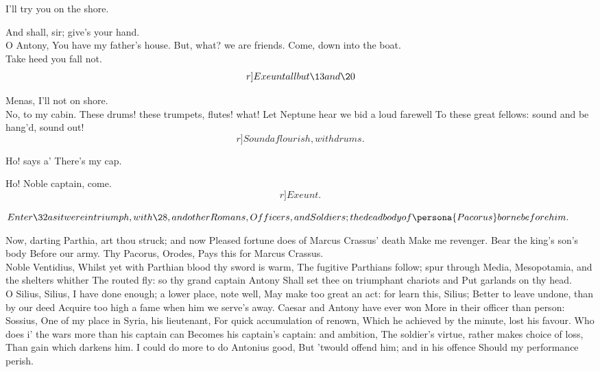 \documentclass{book}
\begin{document}
	I'll try you on the shore.

\1	And shall, sir; give's your hand. \\

	O Antony,
	You have my father's house. But, what? we are friends.
	Come, down into the boat. \\

	Take heed you fall not.
	\[r]Exeunt all but \13 and \20\]

	Menas, I'll not on shore. \\

	No, to my cabin.
	These drums! these trumpets, flutes! what!
	Let Neptune hear we bid a loud farewell
	To these great fellows: sound and be hang'd, sound out!
	\[r]Sound a flourish, with drums.\]

	Ho! says a' There's my cap.

	Ho! Noble captain, come. \[r]Exeunt.\]

\Act





	\(Enter \32 as it were in triumph, with \28,
	and other Romans, Officers, and Soldiers; the dead
	body of \persona{Pacorus} borne before him.\)

	Now, darting Parthia, art thou struck; and now
	Pleased fortune does of Marcus Crassus' death
	Make me revenger. Bear the king's son's body
	Before our army. Thy Pacorus, Orodes,
	Pays this for Marcus Crassus. \\

	Noble Ventidius,
	Whilst yet with Parthian blood thy sword is warm,
	The fugitive Parthians follow; spur through Media,
	Mesopotamia, and the shelters whither
	The routed fly: so thy grand captain Antony
	Shall set thee on triumphant chariots and
	Put garlands on thy head. \\

	O Silius, Silius,
	I have done enough; a lower place, note well,
	May make too great an act: for learn this, Silius;
	Better to leave undone, than by our deed
	Acquire too high a fame when him we serve's away.
	Caesar and Antony have ever won
	More in their officer than person: Sossius,
	One of my place in Syria, his lieutenant,
	For quick accumulation of renown,
	Which he achieved by the minute, lost his favour.
	Who does i' the wars more than his captain can
	Becomes his captain's captain: and ambition,
	The soldier's virtue, rather makes choice of loss,
	Than gain which darkens him.
	I could do more to do Antonius good,
	But 'twould offend him; and in his offence
	Should my performance perish. \\
\end{document}
